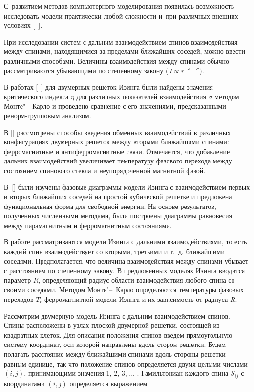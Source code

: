 С~развитием методов компьютерного моделирования появилась возможность исследовать модели практически любой сложности и~при различных внешних условиях [--].



 При исследовании систем с дальним взаимодействием спинов взаимодействия между спинами, находящимися за пределами ближайших соседей, можно ввести различными способами. Величины взаимодействия между спинами обычно рассматриваются убывающими по степенному закону ($J\propto r^{-d-\sigma}$).

  В работах [--] для двумерных решеток Изинга  были найдены значения критического индекса $\eta$ для различных показателей взаимодействия $\sigma$ методом Монте"--~Карло и проведено сравнение с его значениями, предсказанными ренорм-групповым анализом.



 В [] рассмотрены способы введения обменных взаимодействий в различных конфигурациях двумерных решеток между вторыми ближайшими спинами: ферромагнитные и антиферромагнитные связи. Отмечается, что добавление дальних взаимодействий увеличивает температуру фазового перехода между состоянием спинового стекла и неупорядоченной магнитной фазой. 

 В~[] были изучены фазовые диаграммы модели Изинга с взаимодействием первых и вторых ближайших соседей на простой кубической решетке и предложена функциональная форма для свободной энергии. На основе результатов, полученных численными методами, были построены диаграммы равновесия между парамагнитным и ферромагнитным состояниями.



В работе рассматриваются модели Изинга с дальними взаимодействиями, то есть каждый спин взаимодействует со вторыми, третьими и т.~д. ближайшими соседями. Предполагается, что величина взаимодействия между спинами убывает с расстоянием по степенному закону. В предложенных моделях Изинга вводится параметр $R$, определяющий радиус области взаимодействия любого спина со своими соседями. Методом Монте"--~Карло определяются температуры фазовых переходов $T_c$ ферромагнитной модели Изинга и их зависимость от радиуса $R$.



\smallskip



 Рассмотрим двумерную модель Изинга с дальним взаимодействием спинов. Спины расположены в узлах плоской двумерной решетки, состоящей из квадратных клеток. Для описания положения спинов введем прямоугольную систему координат, оси которой направлены вдоль сторон решетки. Будем полагать расстояние между ближайшими спинами вдоль стороны решетки равным единице, так что положение спинов определяется двумя целыми числами $(i, j)$, принимающими значения 1, 2, 3, ... . Гамильтониан каждого спина $S_{ij}$ с координатами $(i, j)$ определяется выражением

